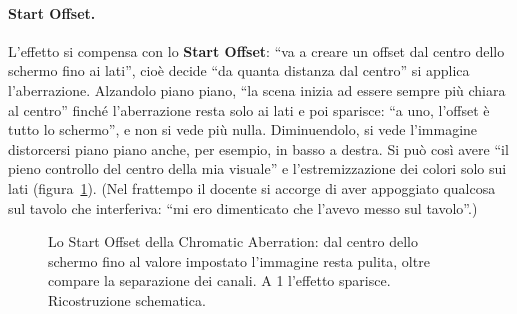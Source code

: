 \paragraph{Start Offset.} L'effetto si compensa con lo \textbf{Start Offset}: ``va a creare un
offset dal centro dello schermo fino ai lati'', cioè decide ``da quanta distanza dal centro''
si applica l'aberrazione. Alzandolo piano piano, ``la scena inizia ad essere sempre più chiara
al centro'' finché l'aberrazione resta solo ai lati e poi sparisce: ``a uno, l'offset è tutto
lo schermo'', e non si vede più nulla. Diminuendolo, si vede l'immagine distorcersi piano piano
anche, per esempio, in basso a destra. Si può così avere ``il pieno controllo del centro della
mia visuale'' e l'estremizzazione dei colori solo sui lati (figura~\ref{ue16:fig:chromatic}).
(Nel frattempo il docente si accorge di aver appoggiato qualcosa sul tavolo che interferiva:
``mi ero dimenticato che l'avevo messo sul tavolo''.)

\begin{figure}[htbp]
\centering
{}
\caption{Lo Start Offset della Chromatic Aberration: dal centro dello schermo fino al valore
impostato l'immagine resta pulita, oltre compare la separazione dei canali. A 1 l'effetto
sparisce. Ricostruzione schematica.}
\label{ue16:fig:chromatic}
\end{figure}

